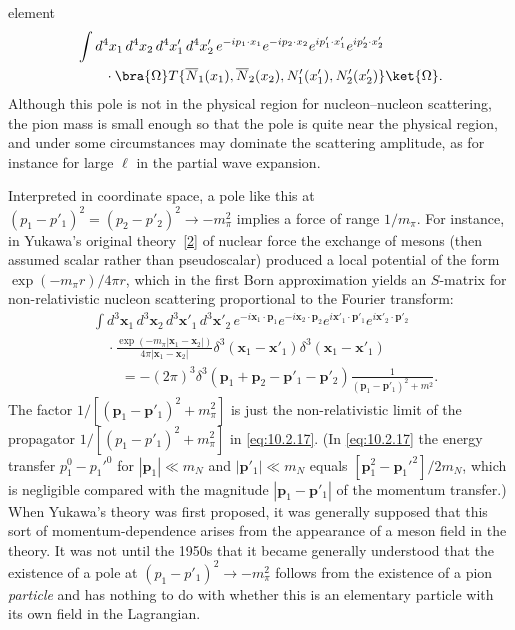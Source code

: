 
element
\begin{align*}
&\int d^4x_1\,d^4x_2\,d^4x'_1\,d^4x'_2\,
e^{-ip_1\cdot x_1}e^{-ip_2\cdot x_2}
e^{ip'_1\cdot x'_1}e^{ip'_2\cdot x'_2}
\\
&\qquad\cdot
\bra{\Omega}T\{\overline N_1(x_1),\overline N_2(x_2),
N'_1(x'_1),N'_2(x'_2)\}\ket{\Omega}.
\end{align*}
Although this pole is not in the physical region for nucleon--nucleon
scattering, the pion mass is small enough so that the pole is quite near the
physical region, and under some circumstances may dominate the scattering
amplitude, as for instance for large $\ell$ in the partial wave expansion.

Interpreted in coordinate space, a pole like this at
$(p_1-p'_1)^2=(p_2-p'_2)^2\to-m_\pi^2$ implies a force of range $1/m_\pi$.
For instance, in Yukawa's original theory~\hyperref[ref:10.2]{[2]} of nuclear
force the exchange of mesons (then assumed scalar rather than pseudoscalar)
produced a local potential of the form $\exp(-m_\pi r)/4\pi r$, which in the
first Born approximation yields an $S$-matrix for non-relativistic nucleon
scattering proportional to the Fourier transform:
\begin{align*}
&\int d^3\mathbf x_1\,d^3\mathbf x_2\,d^3\mathbf x'_1\,d^3\mathbf x'_2\,
e^{-i\mathbf x_1\cdot\mathbf p_1}e^{-i\mathbf x_2\cdot\mathbf p_2}
e^{i\mathbf x'_1\cdot\mathbf p'_1}e^{i\mathbf x'_2\cdot\mathbf p'_2}
\\
&\quad\cdot
\frac{\exp(-m_\pi|\mathbf x_1-\mathbf x_2|)}
{4\pi|\mathbf x_1-\mathbf x_2|}
\delta^3(\mathbf x_1-\mathbf x'_1)\delta^3(\mathbf x_1-\mathbf x'_1)
\\
&\qquad=-(2\pi)^3\delta^3(\mathbf p_1+\mathbf p_2-
\mathbf p'_1-\mathbf p'_2)\frac{1}{(\mathbf p_1-\mathbf p'_1)^2+m^2}.
\end{align*}
The factor $1/[(\mathbf p_1-\mathbf p'_1)^2+m_\pi^2]$ is just the
non-relativistic limit of the propagator
$1/[(p_1-p'_1)^2+m_\pi^2]$ in \eqref{eq:10.2.17}. (In \eqref{eq:10.2.17}
the energy transfer $p_1^0-p_1'^0$ for $|\mathbf p_1|\ll m_N$ and
$|\mathbf p'_1|\ll m_N$ equals
$[\mathbf p_1^2-\mathbf p_1'^2]/2m_N$, which is negligible compared with the
magnitude $|\mathbf p_1-\mathbf p'_1|$ of the momentum transfer.) When
Yukawa's theory was first proposed, it was generally supposed that this sort
of momentum-dependence arises from the appearance of a meson field in the
theory. It was not until the 1950s that it became generally understood that
the existence of a pole at $(p_1-p'_1)^2\to-m_\pi^2$ follows from the
existence of a pion \emph{particle} and has nothing to do with whether this is
an elementary particle with its own field in the Lagrangian.

